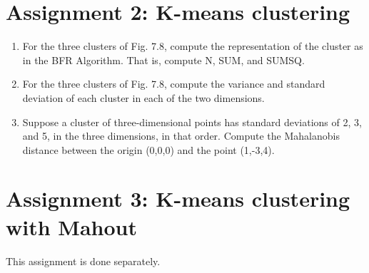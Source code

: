\documentclass{article}
\begin{document}
\section{Assignment 2: K-means clustering}
\begin{enumerate}
\item{For the three clusters of Fig. 7.8, compute the representation of the cluster as in the BFR Algorithm. That is, compute N, SUM, and SUMSQ.}
\item{For the three clusters of Fig. 7.8, compute the variance and standard deviation of each cluster in each of the two dimensions.}
\item{Suppose a cluster of three-dimensional points has standard deviations of 2, 3, and 5, in the three dimensions, in that order. Compute the Mahalanobis distance between the origin (0,0,0) and the point (1,-3,4).}
\end{enumerate}

\section{Assignment 3: K-means clustering with Mahout}
This assignment is done separately.
\end{document}
